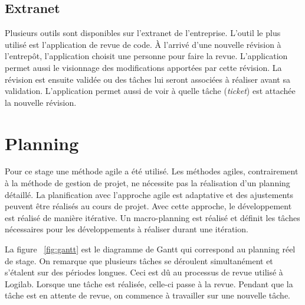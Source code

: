 \subsection{Extranet} 
Plusieurs outils sont disponibles sur l'extranet de l'entreprise. L'outil le 
plus utilisé est l'application de revue de code. \`A l'arrivé d'une nouvelle 
révision à l'entrepôt, l'application choisit une personne pour faire la revue. 
L'application permet aussi le visionnage des modifications apportées par cette 
révision. La révision est ensuite validée ou des tâches lui seront associées 
à réaliser avant sa validation. L'application
permet aussi de voir à quelle tâche (\textit{ticket}) est attachée la nouvelle
révision.   

\section{Planning} 
Pour ce stage une méthode agile a été utilisé. Les méthodes agiles, contrairement 
à la méthode de gestion de projet, ne nécessite pas la réalisation d'un planning 
détaillé. La planification avec l'approche agile est adaptative et des ajustements 
peuvent être réalisés au cours de projet. Avec cette approche, le développement 
est réalisé de manière itérative. Un macro-planning est réalisé et définit
les tâches nécessaires pour les développements à réaliser durant 
une itération. 

La figure ~\ref{fig:gantt} est le diagramme de Gantt qui correspond au planning
réel de stage. On remarque que plusieurs tâches se déroulent simultanément et
s'étalent sur des périodes longues. Ceci est dû au processus de revue utilisé à
Logilab. Lorsque une tâche est réalisée, celle-ci passe à la revue. Pendant que
la tâche est en attente de revue, on commence à travailler sur une nouvelle
tâche.


